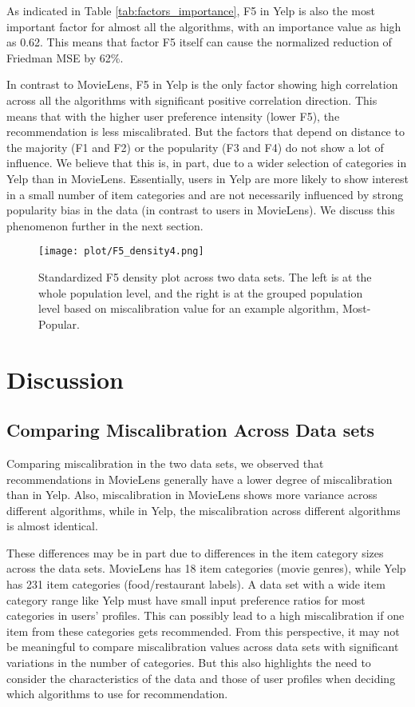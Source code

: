 As indicated in Table \ref{tab:factors_importance}, F5 in Yelp is also the most important factor for almost all the algorithms, with an importance value as high as 0.62. This means that factor F5 itself can cause the normalized reduction of Friedman MSE by 62\%. 

In contrast to MovieLens, F5 in Yelp is the only factor showing high correlation across all the algorithms with significant positive correlation direction. This means that with the higher user preference intensity (lower F5), the recommendation is less miscalibrated. But the factors that depend on distance to the majority (F1 and F2) or the popularity (F3 and F4) do not show a lot of influence. We believe that this is, in part, due to a wider selection of categories in Yelp than in MovieLens. Essentially, users in Yelp are more likely to show interest in a small number of item categories and are not necessarily influenced by strong popularity bias in the data (in contrast to users in MovieLens). We discuss this phenomenon further in the next section. 

\begin{figure*}[!hbtp]
    \centering
    \texttt{[image: plot/F5\_density4.png]}
    \caption{Standardized F5 density plot across two data sets. The left is at the whole population level, and the right is at the grouped population level based on miscalibration value for an example algorithm, Most-Popular.}
    \label{fig:f5_dist}
\end{figure*}

\section{Discussion}

\subsection {Comparing Miscalibration Across Data sets}

Comparing miscalibration in the two data sets, we observed that recommendations in MovieLens generally have a lower degree of miscalibration than in Yelp. Also, miscalibration in MovieLens shows more variance across different algorithms, while in Yelp, the miscalibration across different algorithms is almost identical. 

These differences may be in part due to differences in the item category sizes across the data sets. MovieLens has 18 item categories (movie genres), while Yelp has 231 item categories (food/restaurant labels). A data set with a wide item category range like Yelp must have small input preference ratios for most categories in users' profiles. This can possibly lead to a high miscalibration if one item from these categories gets recommended. From this perspective, it may not be meaningful to compare miscalibration values across data sets with significant variations in the number of categories. But this also highlights the need to consider the characteristics of the data and those of user profiles when deciding which algorithms to use for recommendation.

